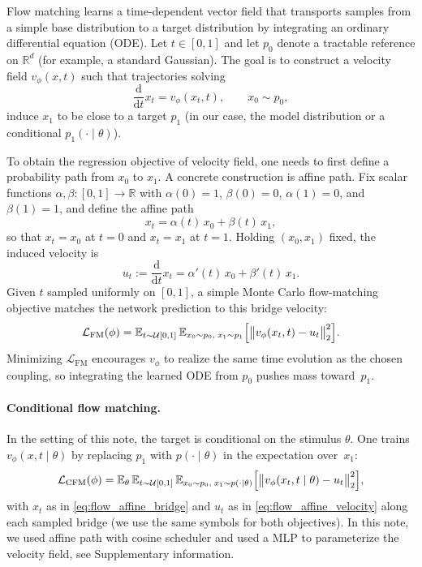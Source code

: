 Flow matching learns a time-dependent vector field that transports samples from a simple base distribution to a target distribution by integrating an ordinary differential equation (ODE).
Let $t \in [0,1]$ and let $p_0$ denote a tractable reference on $\mathbb{R}^{d}$ (for example, a standard Gaussian).
The goal is to construct a velocity field $v_{\phi}(x,t)$ such that trajectories solving
\begin{equation}
  \frac{\mathrm{d}}{\mathrm{d}t} x_t = v_{\phi}(x_t,t), \qquad x_0 \sim p_0,
\end{equation}
induce $x_1$ to be close to a target $p_1$ (in our case, the model distribution or a conditional $p_1(\cdot\mid\theta)$).

To obtain the regression objective of velocity field, one needs to first define a probability path from $x_0$ to $x_1$. A concrete construction is affine path. Fix scalar functions $\alpha,\beta : [0,1] \to \mathbb{R}$ with $\alpha(0)=1$, $\beta(0)=0$, $\alpha(1)=0$, and $\beta(1)=1$, and define the affine path
\begin{equation}
  x_t = \alpha(t)\,x_0 + \beta(t)\,x_1,
  \label{eq:flow_affine_bridge}
\end{equation}
so that $x_t=x_0$ at $t=0$ and $x_t=x_1$ at $t=1$.
Holding $(x_0,x_1)$ fixed, the induced velocity is
\begin{equation}
  u_t := \frac{\mathrm{d}}{\mathrm{d}t} x_t = \alpha'(t)\,x_0 + \beta'(t)\,x_1.
  \label{eq:flow_affine_velocity}
\end{equation}
Given $t$ sampled uniformly on $[0,1]$, a simple Monte Carlo flow-matching objective matches the network prediction to this bridge velocity:
\begin{equation}
  \mathcal{L}_{\mathrm{FM}}(\phi)
  =
  \mathbb{E}_{t \sim \mathcal{U}[0,1]}\,
  \mathbb{E}_{x_0 \sim p_0,\; x_1 \sim p_1}
  \Bigl[
    \bigl\lVert v_{\phi}(x_t,t) - u_t \bigr\rVert_2^2
  \Bigr].
\end{equation}
Minimizing $\mathcal{L}_{\mathrm{FM}}$ encourages $v_{\phi}$ to realize the same time evolution as the chosen coupling, so integrating the learned ODE from $p_0$ pushes mass toward~$p_1$.

\paragraph{Conditional flow matching.}
In the setting of this note, the target is conditional on the stimulus $\theta$.
One trains $v_{\phi}(x,t\mid\theta)$ by replacing $p_1$ with $p(\cdot\mid\theta)$ in the expectation over~$x_1$:
\begin{equation}
  \mathcal{L}_{\mathrm{CFM}}(\phi)
  =
  \mathbb{E}_{\theta}\,
  \mathbb{E}_{t \sim \mathcal{U}[0,1]}\,
  \mathbb{E}_{x_0 \sim p_0,\; x_1 \sim p(\cdot\mid\theta)}
  \Bigl[
    \bigl\lVert v_{\phi}(x_t,t\mid\theta) - u_t \bigr\rVert_2^2
  \Bigr],
\end{equation}
with $x_t$ as in \eqref{eq:flow_affine_bridge} and $u_t$ as in \eqref{eq:flow_affine_velocity} along each sampled bridge (we use the same symbols for both objectives). In this note, we used affine path with cosine scheduler and used a MLP to parameterize the velocity field, see Supplementary information.

